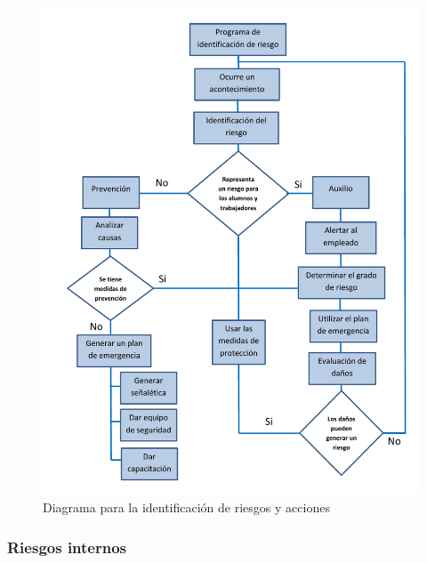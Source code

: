     \begin{figure}[H]
    \centering
    \includegraphics[scale=0.32]{19/Img/diagrama1.pdf}
    \caption{Diagrama para la identificación de riesgos y acciones}
    \label{fig:diagrama-1}
    \end{figure}

     \subsubsection{Riesgos internos}

